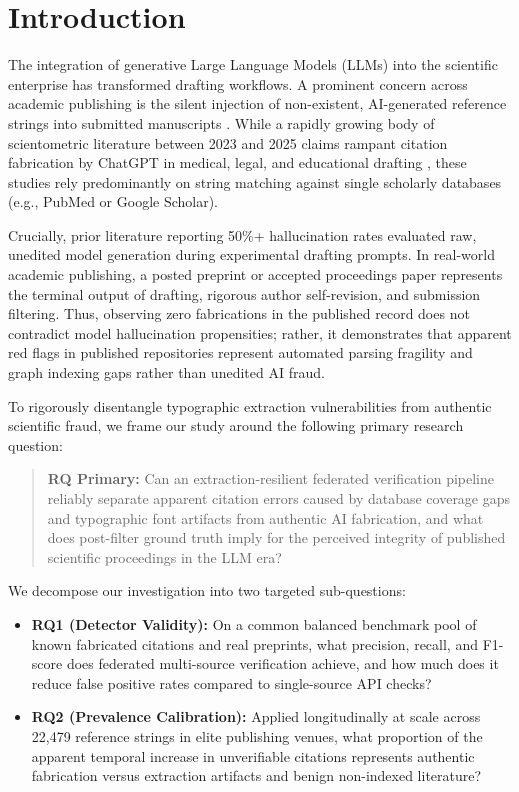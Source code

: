 \documentclass[11pt, a4paper]{article}
\begin{document}
\section{Introduction}
The integration of generative Large Language Models (LLMs) into the scientific enterprise has transformed drafting workflows. A prominent concern across academic publishing is the silent injection of non-existent, AI-generated reference strings into submitted manuscripts \citep{bhattacharyya2023, eysenbach2023}. While a rapidly growing body of scientometric literature between 2023 and 2025 claims rampant citation fabrication by ChatGPT in medical, legal, and educational drafting \citep{day2023, walters2023}, these studies rely predominantly on string matching against single scholarly databases (e.g., PubMed or Google Scholar).

Crucially, prior literature reporting 50\%+ hallucination rates evaluated raw, unedited model generation during experimental drafting prompts. In real-world academic publishing, a posted preprint or accepted proceedings paper represents the terminal output of drafting, rigorous author self-revision, and submission filtering. Thus, observing zero fabrications in the published record does not contradict model hallucination propensities; rather, it demonstrates that apparent red flags in published repositories represent automated parsing fragility and graph indexing gaps rather than unedited AI fraud.

To rigorously disentangle typographic extraction vulnerabilities from authentic scientific fraud, we frame our study around the following primary research question:

\begin{quote}
\textbf{RQ Primary:} Can an extraction-resilient federated verification pipeline reliably separate apparent citation errors caused by database coverage gaps and typographic font artifacts from authentic AI fabrication, and what does post-filter ground truth imply for the perceived integrity of published scientific proceedings in the LLM era?
\end{quote}

We decompose our investigation into two targeted sub-questions:
\begin{itemize}
    \item \textbf{RQ1 (Detector Validity):} On a common balanced benchmark pool of known fabricated citations and real preprints, what precision, recall, and F1-score does federated multi-source verification achieve, and how much does it reduce false positive rates compared to single-source API checks?
    \item \textbf{RQ2 (Prevalence Calibration):} Applied longitudinally at scale across 22,479 reference strings in elite publishing venues, what proportion of the apparent temporal increase in unverifiable citations represents authentic fabrication versus extraction artifacts and benign non-indexed literature?
\end{itemize}
\end{document}

